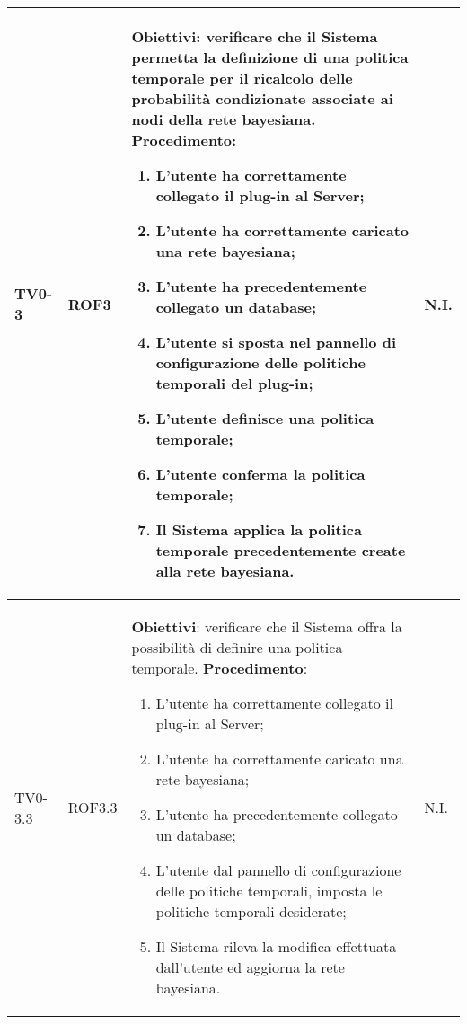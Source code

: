 \begin{longtable}{|C{.15\textwidth}|C{.13\textwidth}|m{.52\textwidth}|C{.08\textwidth}|}
TV0-3 & ROF3 &
	\textbf{Obiettivi}: verificare che il Sistema permetta la definizione di una politica temporale per il ricalcolo delle probabilità condizionate associate ai nodi della rete bayesiana. \newline
	\textbf{Procedimento}:
	\begin{enumerate}
		\item L'utente ha correttamente collegato il plug-in al Server;
		\item L'utente ha correttamente caricato una rete bayesiana;
		\item L'utente ha precedentemente collegato un database;
		\item L'utente si sposta nel pannello di configurazione delle politiche temporali del plug-in;
		\item L'utente definisce una politica temporale;
		\item L'utente conferma la politica temporale;
		\item Il Sistema applica la politica temporale precedentemente create alla rete bayesiana.
	\end{enumerate}
	& N.I. \\
\hline

TV0-3.3 & ROF3.3 &
	\textbf{Obiettivi}: verificare che il Sistema offra la possibilità di definire una politica temporale. \newline
	\textbf{Procedimento}:
	\begin{enumerate}
		\item L'utente ha correttamente collegato il plug-in al Server;
		\item L'utente ha correttamente caricato una rete bayesiana;
		\item L'utente ha precedentemente collegato un database;
		\item L'utente dal pannello di configurazione delle politiche temporali, imposta le politiche temporali desiderate;
		\item Il Sistema rileva la modifica effettuata dall'utente ed aggiorna la rete bayesiana.
	\end{enumerate}
	& N.I. \\
\hline


\end{longtable}
